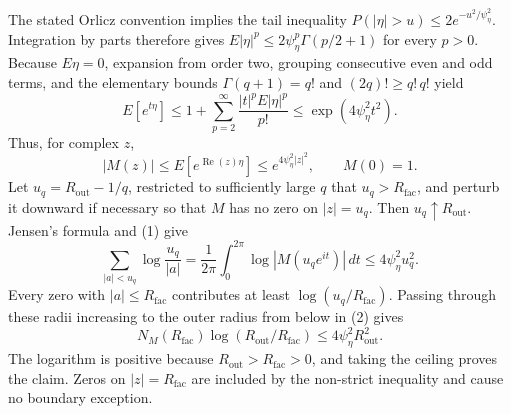 The stated Orlicz convention implies the tail inequality \(P(|\eta|>u)\le2e^{-u^2/\psi_{\eta}^2}\).  Integration by parts therefore gives \(E|\eta|^p\le2\psi_{\eta}^p\Gamma(p/2+1)\) for every \(p>0\).  Because \(E\eta=0\), expansion from order two, grouping consecutive even and odd terms, and the elementary bounds \(\Gamma(q+1)=q!\) and \((2q)!\ge q!\,q!\) yield
\[
 E[e^{t\eta}]
 \le1+\sum_{p=2}^{\infty}\frac{|t|^pE|\eta|^p}{p!}
 \le \exp(4\psi_{\eta}^2t^2).
\]
Thus, for complex \(z\),
\[
 |M(z)|\le E[e^{\operatorname{Re}(z)\eta}]
 \le e^{4\psi_{\eta}^2|z|^2},
 \qquad M(0)=1. \tag{1}
\]
Let \(u_q=R_{\mathrm{out}}-1/q\), restricted to sufficiently large \(q\) that \(u_q>R_{\mathrm{fac}}\), and perturb it downward if necessary so that \(M\) has no zero on \(|z|=u_q\).  Then \(u_q\uparrow R_{\mathrm{out}}\).  Jensen's formula and (1) give
\[
 \sum_{|a|<u_q}\log\frac{u_q}{|a|}
 =\frac1{2\pi}\int_0^{2\pi}\log|M(u_qe^{it})|\,dt
 \le4\psi_{\eta}^2u_q^2. \tag{2}
\]
Every zero with \(|a|\le R_{\mathrm{fac}}\) contributes at least \(\log(u_q/R_{\mathrm{fac}})\).  Passing through these radii increasing to the outer radius from below in (2) gives
\[
 N_M(R_{\mathrm{fac}})\log(R_{\mathrm{out}}/R_{\mathrm{fac}})
 \le4\psi_{\eta}^2R_{\mathrm{out}}^2.
\]
The logarithm is positive because \(R_{\mathrm{out}}>R_{\mathrm{fac}}>0\), and taking the ceiling proves the claim.  Zeros on \(|z|=R_{\mathrm{fac}}\) are included by the non-strict inequality and cause no boundary exception.